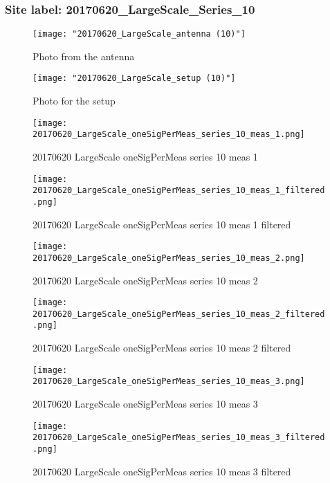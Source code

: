 \subsubsection{Site label: 20170620\_LargeScale\_Series\_10}
\begin{figure}[ht] \caption{Photo from the antenna}
\texttt{[image: "20170620\_LargeScale\_antenna (10)"]}\centering\end{figure}
\begin{figure}[ht] \caption{Photo for the setup}
\texttt{[image: "20170620\_LargeScale\_setup (10)"]}\centering\end{figure}
\begin{figure}[ht] \caption{20170620 LargeScale oneSigPerMeas series 10 meas 1}
\texttt{[image: 20170620\_LargeScale\_oneSigPerMeas\_series\_10\_meas\_1.png]}\centering\end{figure}
\begin{figure}[ht] \caption{20170620 LargeScale oneSigPerMeas series 10 meas 1 filtered}
\texttt{[image: 20170620\_LargeScale\_oneSigPerMeas\_series\_10\_meas\_1\_filtered.png]}\centering\end{figure}
\begin{figure}[ht] \caption{20170620 LargeScale oneSigPerMeas series 10 meas 2}
\texttt{[image: 20170620\_LargeScale\_oneSigPerMeas\_series\_10\_meas\_2.png]}\centering\end{figure}
\begin{figure}[ht] \caption{20170620 LargeScale oneSigPerMeas series 10 meas 2 filtered}
\texttt{[image: 20170620\_LargeScale\_oneSigPerMeas\_series\_10\_meas\_2\_filtered.png]}\centering\end{figure}
\begin{figure}[ht] \caption{20170620 LargeScale oneSigPerMeas series 10 meas 3}
\texttt{[image: 20170620\_LargeScale\_oneSigPerMeas\_series\_10\_meas\_3.png]}\centering\end{figure}
\begin{figure}[ht] \caption{20170620 LargeScale oneSigPerMeas series 10 meas 3 filtered}
\texttt{[image: 20170620\_LargeScale\_oneSigPerMeas\_series\_10\_meas\_3\_filtered.png]}\centering\end{figure}
\clearpage
